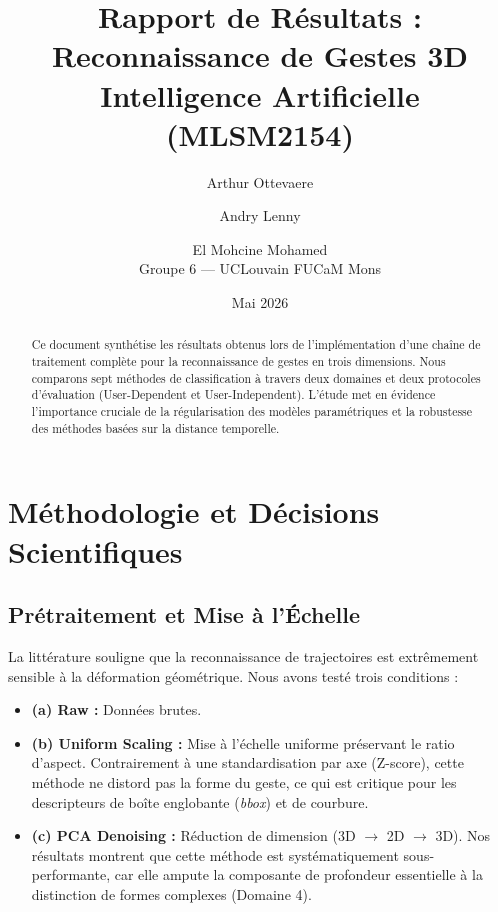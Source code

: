 \documentclass[a4paper,11pt]{article}
\title{\textbf{Rapport de Résultats : Reconnaissance de Gestes 3D}\\ \large Intelligence Artificielle (MLSM2154)}
\author{Arthur Ottevaere \and Andry Lenny \and El Mohcine Mohamed \\ \small Groupe 6 --- UCLouvain FUCaM Mons}
\date{Mai 2026}
\begin{document}
\maketitle

\begin{abstract}
Ce document synthétise les résultats obtenus lors de l'implémentation d'une chaîne de traitement complète pour la reconnaissance de gestes en trois dimensions. Nous comparons sept méthodes de classification à travers deux domaines et deux protocoles d'évaluation (User-Dependent et User-Independent). L'étude met en évidence l'importance cruciale de la régularisation des modèles paramétriques et la robustesse des méthodes basées sur la distance temporelle.
\end{abstract}

\section{Méthodologie et Décisions Scientifiques}

\subsection{Prétraitement et Mise à l'Échelle}
La littérature souligne que la reconnaissance de trajectoires est extrêmement sensible à la déformation géométrique. Nous avons testé trois conditions :
\begin{itemize}
    \item \textbf{(a) Raw :} Données brutes.
    \item \textbf{(b) Uniform Scaling :} Mise à l'échelle uniforme préservant le ratio d'aspect. Contrairement à une standardisation par axe (Z-score), cette méthode ne distord pas la forme du geste, ce qui est critique pour les descripteurs de boîte englobante (\textit{bbox}) et de courbure.
    \item \textbf{(c) PCA Denoising :} Réduction de dimension (3D $\to$ 2D $\to$ 3D). Nos résultats montrent que cette méthode est systématiquement sous-performante, car elle ampute la composante de profondeur essentielle à la distinction de formes complexes (Domaine 4).
\end{itemize}
\end{document}
